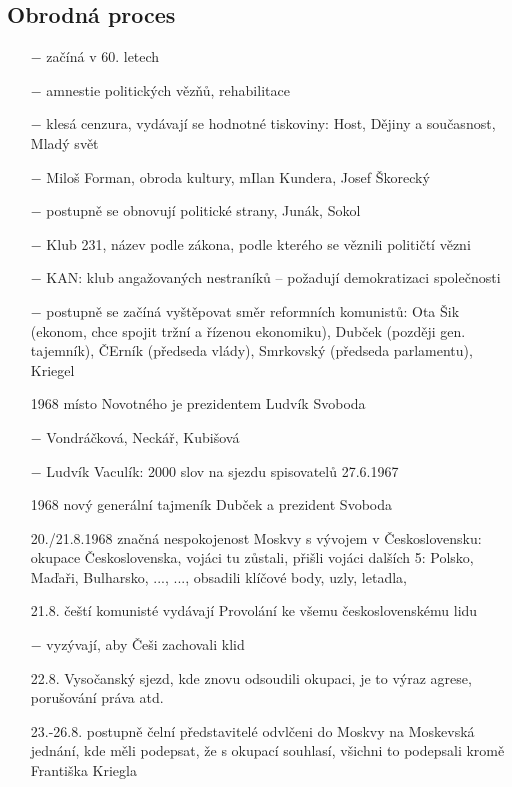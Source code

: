 \documentclass{article}
\begin{document}
\subsection*{Obrodná proces}
\begin{itemize}
    \vspace{-0.5em}
    \setlength\itemsep{0.15em}
    \item[$-$] začíná v 60. letech
    \item[$-$] amnestie politických vězňů, rehabilitace
    \item[$-$] klesá cenzura, vydávají se hodnotné tiskoviny: Host, Dějiny a současnost, Mladý svět
    \item[$-$] Miloš Forman, obroda kultury, mIlan Kundera, Josef Škorecký
    \item[$-$] postupně se obnovují politické strany, Junák, Sokol
    \item[$-$] Klub 231, název podle zákona, podle kterého se věznili političtí vězni
    \item[$-$] KAN: klub angažovaných nestraníků -- požadují demokratizaci společnosti
    \item[$-$] postupně se začíná vyštěpovat směr reformních komunistů: Ota Šik (ekonom, chce spojit tržní a řízenou ekonomiku), Dubček (později gen. tajemník), ČErník (předseda vlády), Smrkovský (předseda parlamentu), Kriegel
    \item[1968] místo Novotného je prezidentem Ludvík Svoboda
    \item[$-$] Vondráčková, Neckář, Kubišová
    \item[$-$] Ludvík Vaculík: 2000 slov na sjezdu spisovatelů 27.6.1967
    \item[1968] nový generální tajmeník Dubček a prezident Svoboda
    \item[20./21.8.1968] značná nespokojenost Moskvy s vývojem v Československu: okupace Československa, vojáci tu zůstali, přišli vojáci dalších 5: Polsko, Maďaři, Bulharsko, ..., ..., obsadili klíčové body, uzly, letadla,
    \item[21.8.] čeští komunisté vydávají Provolání ke všemu československému lidu
    \item[$-$] vyzývají, aby Češi zachovali klid
    \item[22.8.] Vysočanský sjezd, kde znovu odsoudili okupaci, je to výraz agrese, porušování práva atd.
    \item[23.-26.8.] postupně čelní představitelé odvlčeni do Moskvy na Moskevská jednání, kde měli podepsat, že s okupací souhlasí, všichni to podepsali kromě Františka Kriegla

\end{itemize}
\end{document}
